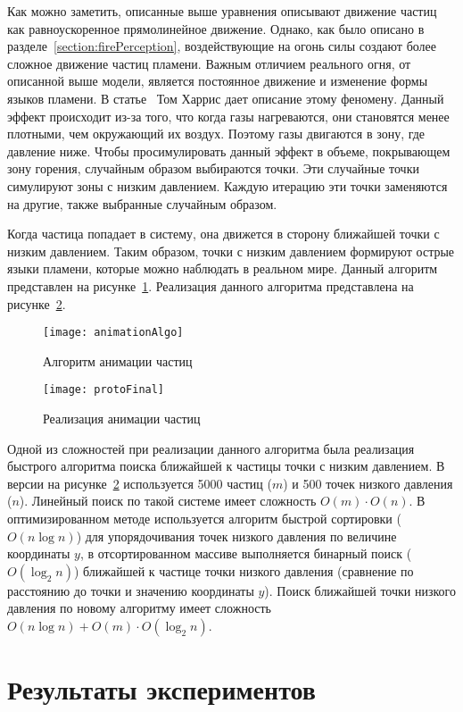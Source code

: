 Как можно заметить, описанные выше уравнения описывают движение частиц как
равноускоренное прямолинейное движение. Однако, как было описано в
разделе~\ref{section:firePerception}, воздействующие на огонь силы создают более
сложное движение частиц пламени. Важным отличием реального огня, от описанной
выше модели, является постоянное движение и изменение формы языков пламени. В
статье~\cite{Harris} Том Харрис дает описание этому феномену. Данный эффект
происходит из-за того, что когда газы нагреваются, они становятся менее
плотными, чем окружающий их воздух. Поэтому газы двигаются в зону, где давление
ниже. Чтобы просимулировать данный эффект в объеме, покрывающем зону горения,
случайным образом выбираются точки. Эти случайные точки симулируют зоны с
низким давлением. Каждую итерацию эти точки заменяются на другие, также
выбранные случайным образом.

Когда частица попадает в систему, она движется в сторону ближайшей точки с
низким давлением. Таким образом, точки с низким давлением формируют острые языки
пламени, которые можно наблюдать в реальном мире. Данный алгоритм представлен на
рисунке~\ref{fig:animationAlgo}. Реализация данного алгоритма представлена на
рисунке~\ref{fig:protoFinal}.
\begin{figure}[htb]
	\centering
    \texttt{[image: animationAlgo]}
    \caption{Алгоритм анимации частиц}%
    \label{fig:animationAlgo}
\end{figure}
\begin{figure}[htb]
	\centering
    \texttt{[image: protoFinal]}
    \caption{Реализация анимации частиц}%
    \label{fig:protoFinal}
\end{figure}

Одной из сложностей при реализации данного алгоритма была реализация быстрого
алгоритма поиска ближайшей к частицы точки с низким давлением. В версии на
рисунке~\ref{fig:protoFinal} используется 5000 частиц ($m$) и 500 точек низкого
давления ($n$). Линейный поиск по такой системе имеет сложность
$O(m) \cdot O(n)$.
В оптимизированном методе используется алгоритм быстрой сортировки
($O(n \log n)$) для упорядочивания точек низкого давления по величине
координаты $y$, в отсортированном массиве выполняется бинарный поиск
($O(\log_{2} n)$) ближайшей к частице точки низкого давления (сравнение по
расстоянию до точки и значению координаты $y$). Поиск ближайшей точки низкого
давления по новому алгоритму имеет сложность
$O(n \log n) + O(m) \cdot O(\log_{2} n)$.

\section{Результаты экспериментов}

